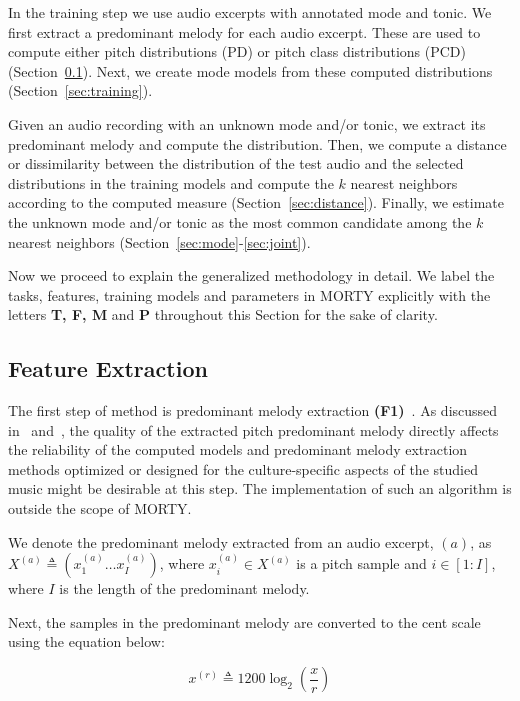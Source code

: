 \documentclass{sig-alternate}
\begin{document}
In the training step we use audio excerpts with annotated mode and tonic. We first extract a predominant me\-lody for each audio excerpt. These are used to compute either pitch distributions (PD) or pitch class distributions (PCD) (Section~\ref{sec:feature}). Next, we create mode models from these computed distributions (Section~\ref{sec:training}). 

Given an audio recording with an unknown mode and/or tonic, we extract its predominant melody and compute the distribution. Then, we compute a distance or dissimilarity between the distribution of the test audio and the selected distributions in the training models and compute the $k$ nearest neighbors according to the computed measure (Section~\ref{sec:distance}). Finally, we estimate the unknown mode and/or tonic as the most common candidate among the $k$ nearest neighbors (Section~\ref{sec:mode}-\ref{sec:joint}).

Now we proceed to explain the generalized methodology in detail. We label the tasks, features, training models and parameters in MORTY explicitly with the letters {\bf T, F, M} and {\bf P} throughout this Section for the sake of clarity.

\subsection{Feature Extraction}\label{sec:feature}
The first step of method is predominant melody extraction {\bf(F1)}~\cite{bozkurt_tonic, chordia, bozkurt_makam}. As discussed in~\cite{atli2014makamFeature_atmm} and~\cite{bozkurt_tonic}, the quality of the extracted pitch predominant melody directly affects the reliability of the computed models and predominant melody extraction methods optimized or designed for the culture-specific aspects of the studied music might be desirable at this step. The implementation of such an algorithm is outside the scope of MORTY. 

We denote the predominant melody extracted from an audio excerpt, $(a)$, as $X^{(a)}  \triangleq \left(x^{(a)}_1 \dots x^{(a)}_I\right)$, where $x^{(a)}_i \in  X^{(a)}$ is a pitch sample and $i \in [1: I]$, where $I$ is the length of the predominant melody. 

Next, the samples in the predominant melody are converted to the cent scale using the equation below:

\begin{equation}
\label{eq:cent_norm}
x^{(r)}  \triangleq 1200 \log_2\left(\frac{x}{r}\right)
\end{equation}
\end{document}
